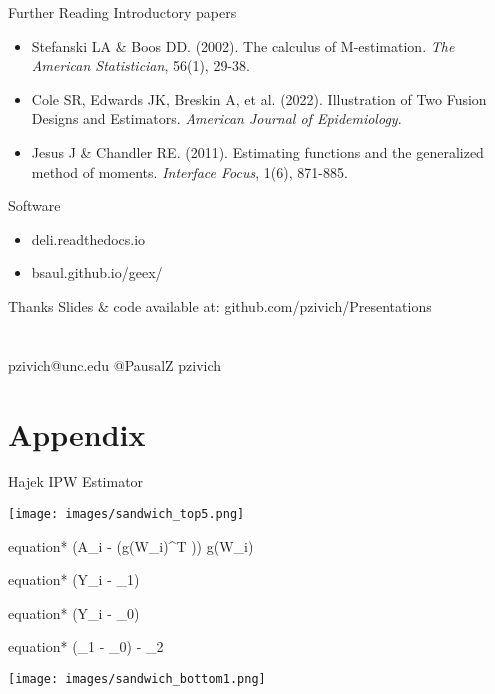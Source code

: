 \documentclass{beamer}
\begin{document}
\begin{frame}{Further Reading}
	Introductory papers
	\begin{itemize}
		\item Stefanski LA \& Boos DD. (2002). The calculus of M-estimation. \textit{The American Statistician}, 56(1), 29-38.
		\item Cole SR, Edwards JK, Breskin A, et al. (2022). Illustration of Two Fusion Designs and Estimators. \textit{American Journal of Epidemiology}.
		\item Jesus J \& Chandler RE. (2011). Estimating functions and the generalized method of moments. \textit{Interface Focus}, 1(6), 871-885.
	\end{itemize}
	Software
	\begin{itemize}
		\item deli.readthedocs.io
		\item bsaul.github.io/geex/
	\end{itemize}
\end{frame}

\begin{frame}{Thanks}
	Slides \& code available at: github.com/pzivich/Presentations\\~\\~\\
	\faEnvelope \quad pzivich@unc.edu \qquad
	\faTwitter \quad @PausalZ \qquad
	\faGithub \quad pzivich\\
\end{frame}

\section{Appendix}

\begin{frame}{Hajek IPW Estimator}
	\centering 
	\begin{center}
		\texttt{[image: images/sandwich\_top5.png]}
		\begin{empheq}[box=\bbox]{equation*}
			\left(A_i - (g(W_i)^T \alpha)\right) g(W_i)
		\end{empheq}
		\begin{empheq}[box=\wbox]{equation*}
			(Y_i - \mu_1) 
		\end{empheq}
		\begin{empheq}[box=\wbox]{equation*}
			(Y_i - \mu_0) 
		\end{empheq}
		\begin{empheq}[box=\wbox]{equation*}
			(\mu_1 - \mu_0) - \mu_2
		\end{empheq}
		\texttt{[image: images/sandwich\_bottom1.png]}
	\end{center}
\end{frame}
\end{document}
